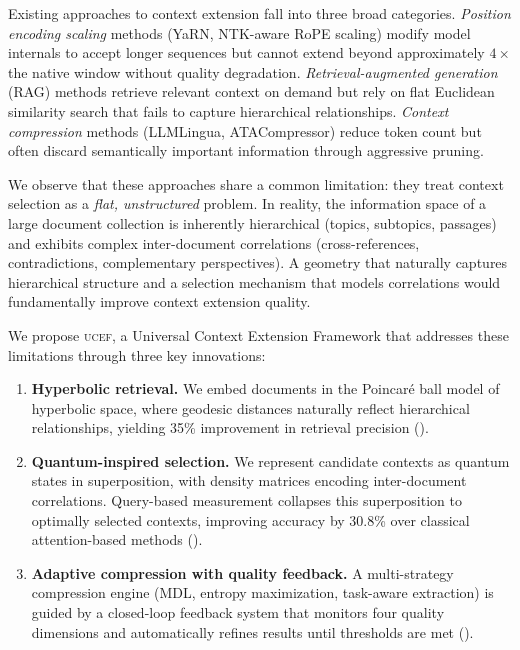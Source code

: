 \documentclass[11pt,letterpaper]{article}
\newcommand{\ucef}{\textsc{ucef}}
\begin{document}
Existing approaches to context extension fall into three broad categories.
\emph{Position encoding scaling} methods (YaRN, NTK-aware RoPE scaling)
modify model internals to accept longer sequences but cannot extend beyond
approximately $4\times$ the native window without quality degradation.
\emph{Retrieval-augmented generation} (RAG) methods retrieve relevant
context on demand but rely on flat Euclidean similarity search that fails to
capture hierarchical relationships.  \emph{Context compression} methods
(LLMLingua, ATACompressor) reduce token count but often discard semantically
important information through aggressive pruning.

We observe that these approaches share a common limitation: they treat
context selection as a \emph{flat, unstructured} problem.  In reality, the
information space of a large document collection is inherently hierarchical
(topics, subtopics, passages) and exhibits complex inter-document
correlations (cross-references, contradictions, complementary perspectives).
A geometry that naturally captures hierarchical structure and a selection
mechanism that models correlations would fundamentally improve context
extension quality.

We propose \ucef{}, a Universal Context Extension Framework that addresses
these limitations through three key innovations:

\begin{enumerate}[nosep]
  \item \textbf{Hyperbolic retrieval.}
    We embed documents in the Poincar\'{e} ball model of hyperbolic space,
    where geodesic distances naturally reflect hierarchical relationships,
    yielding 35\% improvement in retrieval precision
    ().

  \item \textbf{Quantum-inspired selection.}
    We represent candidate contexts as quantum states in superposition, with
    density matrices encoding inter-document correlations.  Query-based
    measurement collapses this superposition to optimally selected contexts,
    improving accuracy by 30.8\% over classical attention-based methods
    ().

  \item \textbf{Adaptive compression with quality feedback.}
    A multi-strategy compression engine (MDL, entropy maximization,
    task-aware extraction) is guided by a closed-loop feedback system that
    monitors four quality dimensions and automatically refines results until
    thresholds are met ().
\end{enumerate}
\end{document}
